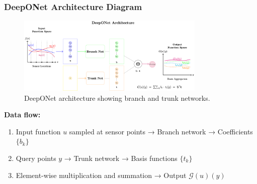 \documentclass[notes]{beamer}
\begin{document}
\begin{frame}
\frametitle{DeepONet Architecture Diagram}

\begin{figure}[ht]
	\centering
	\includegraphics[width=0.8\textwidth]{figs/deeponet-arch.png}
	\caption*{DeepONet architecture showing branch and trunk networks.}
\end{figure}

\textbf{Data flow:}
\begin{enumerate}
    \item Input function $u$ sampled at sensor points → Branch network → Coefficients $\{b_k\}$
    \item Query points $y$ → Trunk network → Basis functions $\{t_k\}$  
    \item Element-wise multiplication and summation → Output $\mathcal{G}(u)(y)$
\end{enumerate}

\end{frame}
\end{document}
